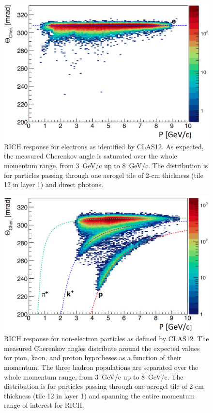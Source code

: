 \documentclass[5p,times,twocolumn]{elsarticle}
\begin{document}
\begin{figure}[t]
\begin{center}
\includegraphics[width=1.05\columnwidth]{Electron_PID2.png}
\end{center}
\caption{RICH response for electrons as identified by CLAS12. As expected, the measured Cherenkov angle
  is saturated over the whole momentum range, from 3~GeV/c up to 8~GeV/c. The distribution is for particles passing
  through one aerogel tile of 2-cm thickness (tile 12 in layer 1) and direct photons.}
\label{Fig:CHele}
\end{figure}

\begin{figure}[t]
\begin{center}
\includegraphics[width=1.05\columnwidth]{Hadron_PID2.png}
\end{center}
\caption{RICH response for non-electron particles as defined by CLAS12. The measured Cherenkov angles distribute
  around the expected values for pion, kaon, and proton hypotheses as a function of their momentum. The three hadron
  populations are separated over the whole momentum range, from 3~GeV/c up to 8~GeV/c. The distribution is for
  particles passing through one aerogel tile of 2-cm thickness (tile 12 in layer 1) and spanning the entire momentum
  range of interest for RICH.}
\label{Fig:CHhad1}
\end{figure}
\end{document}

